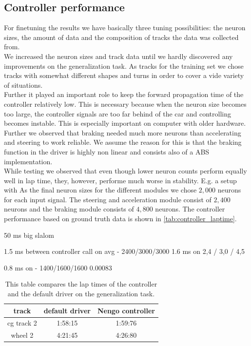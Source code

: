 \documentclass[10pt,a4paper,twoside,journal]{IEEEtran}
\begin{document}
\subsection{Controller performance}
For finetuning the results we have basically three tuning possibilities: the neuron sizes, the amount of data and the composition of tracks the data was collected from. \\
We increased the neuron sizes and track data until we hardly discovered any improvements on the generalization task. As tracks for the training set we chose tracks with somewhat different shapes and turns in order to cover a vide variety of situations. \\
Further it played an important role to keep the forward propagation time of the controller relatively low. This is necessary because when the neuron size becomes too large, the controller signals are too far behind of the car and controlling becomes instable. This is especially important on computer with older hardware. Further we observed that braking needed much more neurons than accelerating and steering to work reliable. We assume the reason for this is that the braking function in the driver is highly non linear and consists also of a ABS implementation. \\
While testing we observed that even though lower neuron counts perform equally well in lap time, they, however, performe much worse in stability. E.g. a setup with 
As the final neuron sizes for the different modules we chose $2,000$ neurons for each input signal. The steering and acceleration module consist of $2,400$ neurons and the braking module consists of $4,800$ neurons. The controller performance based on ground truth data is shown in \autoref{tab:controller_laptime}.

50 ms big slalom

1.5 ms between controller call on avg - 2400/3000/3000
1.6 ms on 2,4 / 3,0 / 4,5

0.8 ms on - 1400/1600/1600
0.00083




\begin{table}[ht]
	\begin{center}
		\begin{tabular}{ |c|c|c| } 
			\hline
			track &  default driver & Nengo controller\\
			\hline
			cg track 2  & 1:58:15 & 1:59:76  \\
			wheel 2 & 4:21:45 & 4:26:80 \\
			\hline
		\end{tabular}
		\caption{\label{tab:controller_laptime}This table compares the lap times of the controller and the default driver on the generalization task.}
	\end{center}
\end{table}
\end{document}
